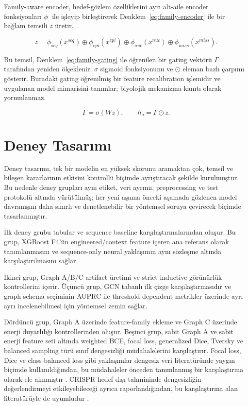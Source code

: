 Family-aware encoder, hedef-gözlem özelliklerini ayrı alt-aile encoder fonksiyonları \(\phi_{\cdot}\) ile işleyip birleştirerek Denklem~\ref{eq:family-encoder} ile bir bağlam temsili \(z\) üretir.

\begin{equation}
z = \phi_{seq}(x^{seq}) \oplus \phi_{epi}(x^{epi}) \oplus \phi_{nuc}(x^{nuc}) \oplus \phi_{miss}(x^{miss}).
\label{eq:family-encoder}
\end{equation}

Bu temsil, Denklem~\ref{eq:family-gating} ile öğrenilen bir gating vektörü \(\Gamma\) tarafından yeniden ölçeklenir; \(\sigma\) sigmoid fonksiyonunu ve \(\odot\) eleman bazlı çarpımı gösterir. Buradaki gating öğrenilmiş bir feature recalibration işlemidir ve uygulanan model mimarisini tanımlar; biyolojik mekanizma kanıtı olarak yorumlanmaz.

\begin{equation}
\Gamma = \sigma(Wz), \qquad h_o = \Gamma \odot z.
\label{eq:family-gating}
\end{equation}

\section{Deney Tasarımı}

Deney tasarımı, tek bir modelin en yüksek skorunu aramaktan çok, temsil ve bileşen kararlarının etkisini kontrollü biçimde ayrıştıracak şekilde kurulmuştur. Bu nedenle deney grupları aynı etiket, veri ayrımı, preprocessing ve test protokolü altında yürütülmüş; her yeni aşama önceki aşamada gözlenen model davranışını daha sınırlı ve denetlenebilir bir yöntemsel soruya çevirecek biçimde tasarlanmıştır.

İlk deney grubu tabular ve sequence baseline karşılaştırmalarından oluşur. Bu grup, XGBoost F4'ün engineered/context feature içeren ana referans olarak tanımlanmasını ve sequence-only neural yaklaşımın aynı sözleşme altında karşılaştırılmasını sağlar.

İkinci grup, Graph A/B/C artifact üretimi ve strict-inductive görünürlük kontrollerini içerir. Üçüncü grup, GCN tabanlı ilk çizge karşılaştırmasıdır ve graph schema seçiminin AUPRC ile threshold-dependent metrikler üzerinde ayrı ayrı incelenebilmesi için yöntemsel zemin sağlar.

Dördüncü grup, Graph A üzerinde feature-family ekleme ve Graph C üzerinde enerji duyarlılığı kontrollerinden oluşur. Beşinci grup, sabit Graph A ve sabit enerji feature seti altında weighted BCE, focal loss, generalized Dice, Tversky ve balanced sampling türü sınıf dengesizliği müdahalelerini karşılaştırır. Focal loss, Dice ve class-balanced loss gibi yaklaşımlar dengesiz veri literatüründe yaygın biçimde kullanıldığından, bu müdahaleler önceden tanımlanmış bir karşılaştırma olarak ele alınmıştır . CRISPR hedef dışı tahmininde dengesizliğin değerlendirmeyi etkileyebileceği ayrıca raporlandığından, bu karşılaştırma alan literatürüyle de uyumludur .

